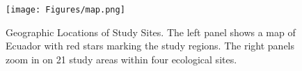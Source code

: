 \begin{figure}
    \centering
    \texttt{[image: Figures/map.png]}
    \caption{Geographic Locations of Study Sites. The left panel shows a map of Ecuador with red stars marking the study regions. The right panels zoom in on 21 study areas within four ecological sites.}
    \label{fig:map}
\end{figure}